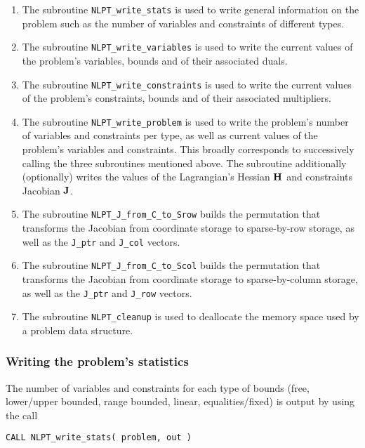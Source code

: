\documentclass{galahad}
\newcommand{\packagename}{NLPT}
\begin{document}
\begin{enumerate}
\item The subroutine {\tt \packagename\_write\_stats} 
      is used to write general information on the problem such
      as the number of variables and constraints of different types.
\item The subroutine {\tt \packagename\_write\_variables}
      is used to write the current values of the problem's variables, bounds
      and of their associated duals.
\item The subroutine {\tt \packagename\_write\_constraints}
      is used to write the current values of the problem's constraints, bounds
      and of their associated multipliers.
\item The subroutine {\tt \packagename\_write\_problem}
      is used to write the problem's number of variables and
      constraints per type, as well as current values of the problem's 
      variables and constraints. This broadly corresponds to successively 
      calling the three subroutines mentioned above. The subroutine
      additionally (optionally) writes the values of the Lagrangian's Hessian
      ${\mathbf{H}}$ and constraints Jacobian ${\mathbf{J}}$.
\item The subroutine {\tt \packagename\_J\_from\_C\_to\_Srow}
      builds the permutation that transforms the Jacobian from
      coordinate storage to sparse-by-row storage, as well as the
      {\tt J\_ptr} and {\tt J\_col} vectors.
\item The subroutine {\tt \packagename\_J\_from\_C\_to\_Scol}
      builds the permutation that transforms the Jacobian from
      coordinate storage to sparse-by-column storage, as well as the
      {\tt J\_ptr} and {\tt J\_row} vectors.
\item The subroutine {\tt \packagename\_cleanup} is used to deallocate
      the memory space used by a problem data structure.
\end{enumerate}

\subsubsection{Writing the problem's statistics}\label{w_stats}

The number of variables and constraints for each type of bounds (free,
lower/upper bounded, range bounded, linear, equalities/fixed) is output
by using the call
\vspace*{1mm}

\hspace{8mm}
{\tt CALL \packagename\_write\_stats( problem, out )}
\end{document}
